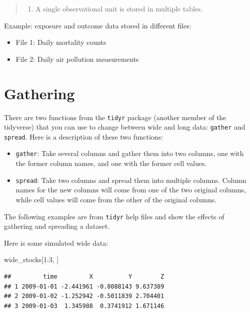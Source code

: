 \documentclass[]{book}
\makeatletter
\newenvironment{Shaded}{\begin{snugshade}}{\end{snugshade}}
\newcommand{\DecValTok}[1]{\textcolor[rgb]{0.00,0.00,0.81}{{#1}}}
\newcommand{\NormalTok}[1]{{#1}}
\providecommand{\tightlist}{%
  \setlength{\itemsep}{0pt}\setlength{\parskip}{0pt}}
\newenvironment{kframe}{%
\medskip{}
\setlength{\fboxsep}{.8em}
 \def\at@end@of@kframe{}%
 \ifinner\ifhmode%
  \def\at@end@of@kframe{\end{minipage}}%
  \begin{minipage}{\columnwidth}%
 \fi\fi%
 \def\FrameCommand##1{\hskip\@totalleftmargin \hskip-\fboxsep
 \colorbox{shadecolor}{##1}\hskip-\fboxsep
     \hskip-\linewidth \hskip-\@totalleftmargin \hskip\columnwidth}%
 \MakeFramed {\advance\hsize-\width
   \@totalleftmargin\z@ \linewidth\hsize
   \@setminipage}}%
 {\par\unskip\endMakeFramed%
 \at@end@of@kframe}
\renewenvironment{Shaded}{\begin{kframe}}{\end{kframe}}
\makeatother
\begin{document}
\begin{quote}
\begin{enumerate}
\def\labelenumi{\arabic{enumi}.}
\setcounter{enumi}{4}
\tightlist
\item
  A single observational unit is stored in multiple tables.
\end{enumerate}
\end{quote}

Example: exposure and outcome data stored in different files:

\begin{itemize}
\tightlist
\item
  File 1: Daily mortality counts
\item
  File 2: Daily air pollution measurements
\end{itemize}

\section{Gathering}\label{gathering}

There are two functions from the \texttt{tidyr} package (another member
of the tidyverse) that you can use to change between wide and long data:
\texttt{gather} and \texttt{spread}. Here is a description of these two
functions:

\begin{itemize}
\tightlist
\item
  \texttt{gather}: Take several columns and gather them into two
  columns, one with the former column names, and one with the former
  cell values.
\item
  \texttt{spread}: Take two columns and spread them into multiple
  columns. Column names for the new columns will come from one of the
  two original columns, while cell values will come from the other of
  the original columns.
\end{itemize}

The following examples are from \texttt{tidyr} help files and show the
effects of gathering and spreading a dataset.

Here is some simulated wide data:

\begin{Shaded}
\begin{Highlighting}[]
\NormalTok{wide_stocks[}\DecValTok{1}\NormalTok{:}\DecValTok{3}\NormalTok{, ]}
\end{Highlighting}
\end{Shaded}

\begin{verbatim}
##         time         X          Y        Z
## 1 2009-01-01 -2.441961 -0.8088143 9.637389
## 2 2009-01-02 -1.252942 -0.5011839 2.704401
## 3 2009-01-03  1.345988  0.3741912 1.671146
\end{verbatim}
\end{document}
